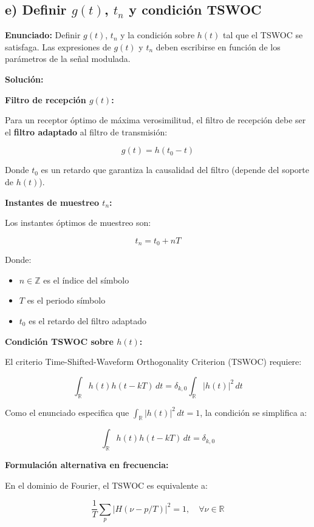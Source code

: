 \documentclass[11pt,a4paper]{article}
\begin{document}
\subsection*{e) Definir $g(t)$, $t_n$ y condici\'on TSWOC}

\textbf{Enunciado:} Definir $g(t)$, $t_n$ y la condici\'on sobre $h(t)$ tal que el TSWOC se satisfaga. Las expresiones de $g(t)$ y $t_n$ deben escribirse en funci\'on de los par\'ametros de la se\~nal modulada.

\vspace{0.3cm}
\textbf{Soluci\'on:}

\textbf{Filtro de recepci\'on $g(t)$:}

Para un receptor \'optimo de m\'axima verosimilitud, el filtro de recepci\'on debe ser el \textbf{filtro adaptado} al filtro de transmisi\'on:

\[
\boxed{g(t) = h(t_0 - t)}
\]

Donde $t_0$ es un retardo que garantiza la causalidad del filtro (depende del soporte de $h(t)$).

\textbf{Instantes de muestreo $t_n$:}

Los instantes \'optimos de muestreo son:

\[
\boxed{t_n = t_0 + nT}
\]

Donde:
\begin{itemize}
    \item $n \in \mathbb{Z}$ es el \'indice del s\'imbolo
    \item $T$ es el periodo s\'imbolo
    \item $t_0$ es el retardo del filtro adaptado
\end{itemize}

\textbf{Condici\'on TSWOC sobre $h(t)$:}

El criterio Time-Shifted-Waveform Orthogonality Criterion (TSWOC) requiere:

\[
\boxed{\int_{\mathbb{R}} h(t) h(t - kT)\, dt = \delta_{k,0} \int_{\mathbb{R}} |h(t)|^2\, dt}
\]

Como el enunciado especifica que $\int_{\mathbb{R}} |h(t)|^2\, dt = 1$, la condici\'on se simplifica a:

\[
\boxed{\int_{\mathbb{R}} h(t) h(t - kT)\, dt = \delta_{k,0}}
\]

\textbf{Formulaci\'on alternativa en frecuencia:}

En el dominio de Fourier, el TSWOC es equivalente a:

\[
\boxed{\frac{1}{T}\sum_p |H(\nu - p/T)|^2 = 1, \quad \forall \nu \in \mathbb{R}}
\]
\end{document}
